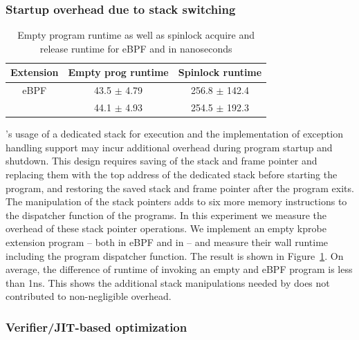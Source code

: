 \subsubsection{Startup overhead due to stack switching}
\begin{table}[t]
    \small
    \centering
    \begin{tabular}{ccc}%
        \toprule
        \textbf{Extension} & \textbf{Empty prog runtime} & \textbf{Spinlock runtime} \\
        \midrule
        eBPF & 43.5 $\pm$ 4.79 & 256.8 $\pm$ 142.4\\
        \projname{} & 44.1 $\pm$ 4.93 & 254.5 $\pm$ 192.3\\
        \bottomrule
    \end{tabular}
    \caption{Empty program runtime as well as spinlock acquire and release
        runtime for eBPF and \projname{} in nanoseconds}
    \vspace{-10pt}
    \label{tab:startup-overhead}
\end{table}

\projname{}'s usage of a dedicated stack for execution and the implementation
    of exception handling support may incur additional overhead during program
    startup and shutdown.
This design requires saving of the stack and frame pointer and replacing them
    with the top address of the dedicated stack before starting the program,
    and restoring the saved stack and frame pointer after the program exits.
The manipulation of the stack pointers adds to six more memory instructions to
    the dispatcher function of the \projname{} programs.
In this experiment we measure the overhead of these stack pointer operations.
We implement an empty kprobe extension program -- both in eBPF and in
    \projname{} -- and measure their wall runtime including the program
    dispatcher function.
The result is shown in Figure~\ref{tab:startup-overhead}.
On average, the difference of runtime of invoking an empty \projname{} and eBPF
    program is less than 1ns.
This shows the additional stack manipulations needed by \projname{} does not
    contributed to non-negligible overhead.

\subsubsection{Verifier/JIT-based optimization}
\label{eval:inline}


